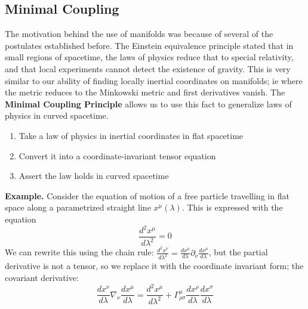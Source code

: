 \documentclass[11pt]{article}
\begin{document}
\subsection{Minimal Coupling}\label{Minimal Coupling}
The motivation behind the use of manifolds was because of several of the postulates established before. The Einstein equivalence principle
stated that in small regions of spacetime, the laws of physics reduce that to special relativity, and that local experiments cannot detect the
existence of gravity. This is very similar to our ability of finding locally inertial coordinates on manifolds; ie where the metric reduces to 
the Minkowski metric and first derivatives vanish. The \textbf{Minimal Coupling Principle} allows us to use this fact to generalize laws of physics
in curved spacetime.

\begin{enumerate}
    \item Take a law of physics in inertial coordinates in flat spacetime
    \item Convert it into a coordinate-invariant tensor equation
    \item Assert the law holds in curved spacetime
\end{enumerate}

\noindent \textbf{Example.} Consider the equation of motion of a free particle travelling in flat space along a parametrized straight line \(x^\mu(\lambda)\). 
This is expressed with the equation 
\[
    \frac{d^2 x^\mu}{d \lambda^2} = 0
\]
\noindent We can rewrite this using the chain rule: \(\frac{d^2 x^\nu}{d \lambda^2} = \frac{d x^\mu}{d \lambda}\partial_\nu \frac{d x^\mu}{d\lambda}\), but the 
partial derivative is not a tensor, so we replace it with the coordinate invariant form; the covariant derivative:
\[
    \frac{d x^\nu}{d\lambda} \nabla_\nu \frac{d x^\mu}{d \lambda} = \frac{d^2x^\mu}{d\lambda^2} + \Gamma^\mu_{\rho \sigma}\frac{dx^\rho}{d\lambda}\frac{dx^\sigma}{d\lambda}
\]
\end{document}
